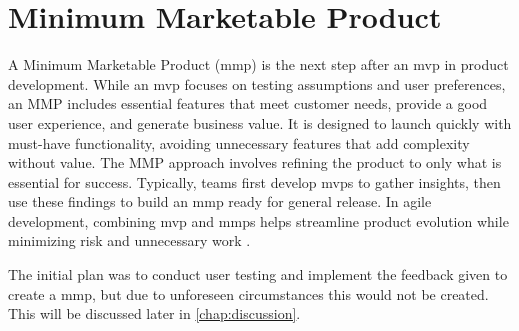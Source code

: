 \section{Minimum Marketable Product}

A Minimum Marketable Product (\acrshort{mmp}) is the next step after an \Gls{mvp} in product development. While an \acrshort{mvp} focuses on testing assumptions and user preferences, an MMP includes essential features that meet customer needs, provide a good user experience, and generate business value. It is designed to launch quickly with must-have functionality, avoiding unnecessary features that add complexity without value. The MMP approach involves refining the product to only what is essential for success. Typically, teams first develop \acrshort{mvp}s to gather insights, then use these findings to build an \acrshort{mmp} ready for general release. In agile development, combining \acrshort{mvp} and \acrshort{mmp}s helps streamline product evolution while minimizing risk and unnecessary work \cite{wanner_mmp}. 

The initial plan was to conduct user testing and implement the feedback given to create a \acrshort{mmp}, but due to unforeseen circumstances this would not be created. This will be discussed later in \autoref{chap:discussion}.
